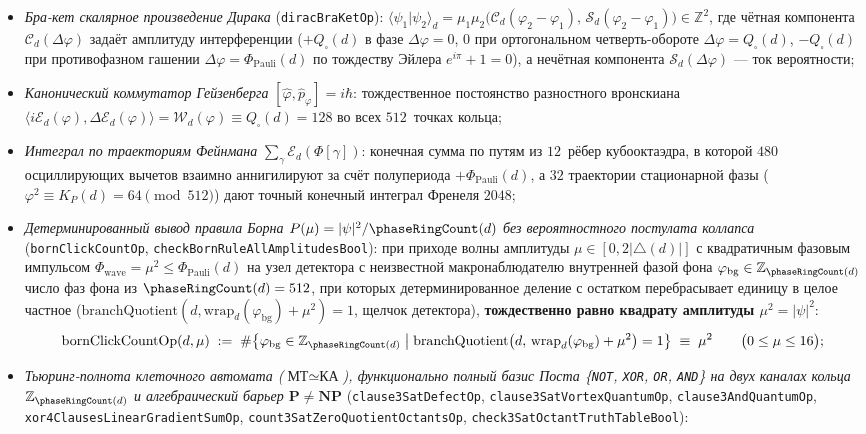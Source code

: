 \begin{theorem}
\begin{enumerate}[label=\textbf{(\roman*)},leftmargin=*]
  \begin{itemize}[noitemsep,leftmargin=*]
  \item \emph{Бра-кет скалярное произведение Дирака} (\texttt{diracBraKetOp}):
    $\langle\psi_1|\psi_2\rangle_d = \mu_1\mu_2\bigl(\mathcal{C}_d(\varphi_2-\varphi_1),\,\mathcal{S}_d(\varphi_2-\varphi_1)\bigr)\in\mathbb{Z}^2$, где чётная компонента $\mathcal{C}_d(\Delta\varphi)$ задаёт амплитуду интерференции ($+Q_\square(d)$ в фазе $\Delta\varphi=0$, $0$ при ортогональном четверть-обороте $\Delta\varphi=Q_\square(d)$, $-Q_\square(d)$ при противофазном гашении $\Delta\varphi=\Phi_{\mathrm{Pauli}}(d)$ по тождеству Эйлера $e^{i\pi}+1=0$), а нечётная компонента $\mathcal{S}_d(\Delta\varphi)$ --- ток вероятности;
  \item \emph{Канонический коммутатор Гейзенберга} $[\hat{\varphi},\hat{p}_\varphi]=i\hbar$:
    тождественное постоянство разностного вронскиана $\langle i\mathcal{E}_d(\varphi),\Delta\mathcal{E}_d(\varphi)\rangle = \mathcal{W}_d(\varphi)\equiv Q_\square(d)=128$ во всех $512$~точках кольца;
  \item \emph{Интеграл по траекториям Фейнмана} $\sum_\gamma \mathcal{E}_d(\Phi[\gamma])$:
    конечная сумма по путям из $12$~рёбер кубооктаэдра, в которой $480$ осциллирующих вычетов взаимно аннигилируют за счёт полупериода $+\Phi_{\mathrm{Pauli}}(d)$, а $32$ траектории стационарной фазы ($\varphi^2\equiv K_P(d)=64\pmod{512}$) дают точный конечный интеграл Френеля $2048$;
  \item \emph{Детерминированный вывод правила Борна $P(\mu) = |\psi|^2/\phaseRingCount(d)$ без вероятностного постулата коллапса} (\texttt{bornClickCountOp}, \texttt{checkBornRuleAllAmplitudesBool}):
    при приходе волны амплитуды $\mu\in[0,2|{\triangle}(d)|]$ с квадратичным фазовым импульсом $\Phi_{\mathrm{wave}}=\mu^2\le\Phi_{\mathrm{Pauli}}(d)$ на узел детектора с неизвестной макронаблюдателю внутренней фазой фона $\varphi_{\mathrm{bg}}\in\mathbb{Z}_{\phaseRingCount(d)}$ число фаз фона из $\phaseRingCount(d)=512$, при которых детерминированное деление с остатком перебрасывает единицу в целое частное ($\mathrm{branchQuotient}(d,\mathrm{wrap}_d(\varphi_{\mathrm{bg}})+\mu^2)=1$, щелчок детектора), \textbf{тождественно равно квадрату амплитуды $\mu^2 = |\psi|^2$}:
    \[
      \mathrm{bornClickCountOp}(d,\mu)
      \;:=\; \#\bigl\{\varphi_{\mathrm{bg}}\in\mathbb{Z}_{\phaseRingCount(d)} \;\big|\; \mathrm{branchQuotient}\bigl(d,\,\mathrm{wrap}_d(\varphi_{\mathrm{bg}})+\mu^2\bigr)=1\bigr\}
      \;\equiv\; \mu^2 \qquad \bigl(0\le\mu\le 16\bigr);
    \]
  \item \emph{Тьюринг-полнота клеточного автомата ($\text{МТ}\simeq\text{КА}$), функционально полный базис Поста \{\texttt{NOT}, \texttt{XOR}, \texttt{OR}, \texttt{AND}\} на двух каналах кольца $\mathbb{Z}_{\phaseRingCount(d)}$ и алгебраический барьер $\mathbf{P}\ne\mathbf{NP}$} (\texttt{clause3SatDefectOp}, \texttt{clause3SatVortexQuantumOp}, \texttt{clause3AndQuantumOp}, \texttt{xor4ClausesLinearGradientSumOp}, \texttt{count3SatZeroQuotientOctantsOp}, \texttt{check3SatOctantTruthTableBool}):

\end{itemize}
\end{enumerate}
\end{theorem}
